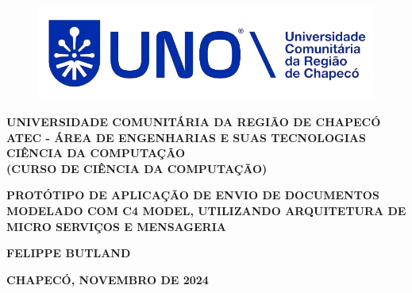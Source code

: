 \begin{center}
            \begin{figure}[htbp]
                \centering
                \includegraphics[width=13cm]{assets/unologo-enhanced}
            \end{figure}
        
            \MakeUppercase{\textbf{Universidade Comunitária da Região de Chapecó}} \\
            \MakeUppercase{\textbf{ATEC - ÁREA DE ENGENHARIAS E SUAS TECNOLOGIAS}}\\
            \MakeUppercase{\textbf{CIÊNCIA DA COMPUTAÇÃO}}\\
            \MakeUppercase{\textbf{(CURSO DE CIÊNCIA DA COMPUTAÇÃO)}}\\
            
            \vspace{4.5cm}
            
            \MakeUppercase{\textbf{PROTÓTIPO DE APLICAÇÃO DE ENVIO DE DOCUMENTOS MODELADO COM C4
            MODEL, UTILIZANDO ARQUITETURA DE MICRO SERVIÇOS E MENSAGERIA}}
            
            \vspace{3.5cm}
            
            \MakeUppercase{\textbf{Felippe Butland}}
            
            \vfill
            
            \MakeUppercase{\textbf{Chapecó, Novembro de 2024}}
         
\end{center}